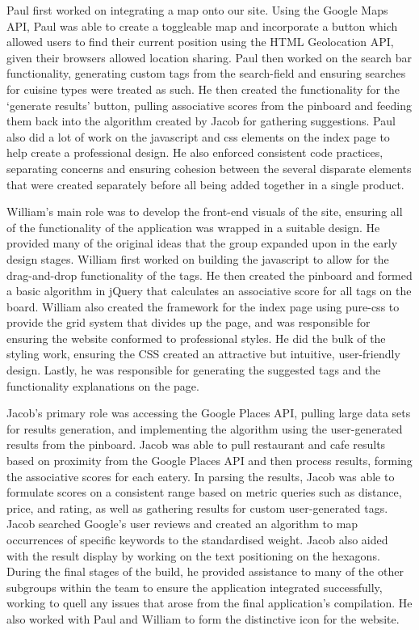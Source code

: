 \documentclass[10pt,a4paper]{article}
\begin{document}
Paul first worked on integrating a map onto our site. Using the Google Maps API, Paul was able to create a toggleable map and incorporate a button which allowed users to find their current position using the HTML Geolocation API, given their browsers allowed location sharing. Paul then worked on the search bar functionality, generating custom tags from the search-field and ensuring searches for cuisine types were treated as such. He then created the functionality for the ‘generate results’ button, pulling associative scores from the pinboard and feeding them back into the algorithm created by Jacob for gathering suggestions. Paul also did a lot of work on the javascript and css elements on the index page to help create a professional design. He also enforced consistent code practices, separating concerns and ensuring cohesion between the several disparate elements that were created separately before all being added together in a single product.

William’s main role was to develop the front-end visuals of the site, ensuring all of the functionality of the application was wrapped in a suitable design. He provided many of the original ideas that the group expanded upon in the early design stages. William first worked on building the javascript to allow for the drag-and-drop functionality of the tags. He then created the pinboard and formed a basic algorithm in jQuery that calculates an associative score for all tags on the board. William also created the framework for the index page using pure-css to provide the grid system that divides up the page, and was responsible for ensuring the website conformed to professional styles. He did the bulk of the styling work, ensuring the CSS created an attractive but intuitive, user-friendly design. Lastly, he was responsible for generating the suggested tags and the functionality explanations on the page.

Jacob’s primary role was accessing the Google Places API, pulling large data sets for results generation, and implementing the algorithm using the user-generated results from the pinboard. Jacob was able to pull restaurant and cafe results based on proximity from the Google Places API and then process results, forming the associative scores for each eatery. In parsing the results, Jacob was able to formulate scores on a consistent range based on metric queries such as distance, price, and rating, as well as gathering results for custom user-generated tags. Jacob searched Google’s user reviews and created an algorithm to map occurrences of specific keywords to the standardised weight. Jacob also aided with the result display by working on the text positioning on the hexagons. During the final stages of the build, he provided assistance to many of the other subgroups within the team to ensure the application integrated successfully, working to quell any issues that arose from the final application’s compilation. He also worked with Paul and William to form the distinctive icon for the website.
\end{document}
